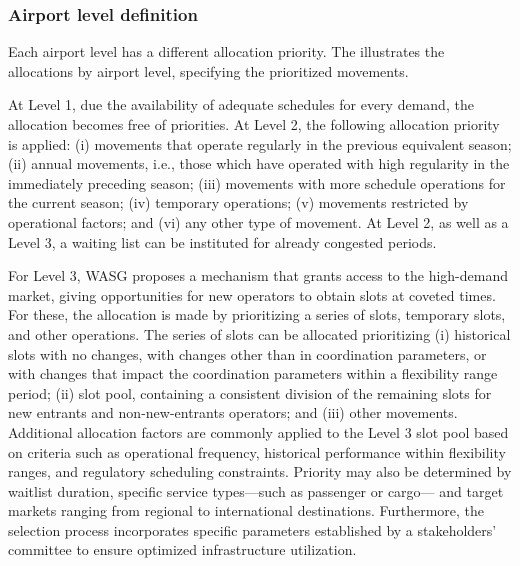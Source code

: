 \subsubsection{Airport level definition}



Each airport level has a different allocation priority.
%
The  illustrates the allocations by airport level,
specifying the prioritized movements.




%



At Level 1, due the availability of adequate schedules for every demand, the
allocation becomes free of priorities.
%
At Level 2, the following allocation priority is applied: (i) movements that
operate regularly in the previous equivalent season; (ii) annual movements,
i.e., those which have operated with high regularity in the immediately
preceding season; (iii) movements with more schedule operations for the current
season; (iv) temporary operations; (v) movements restricted by operational
factors; and (vi) any other type of movement.
%
At Level 2, as well as a Level 3, a waiting list can be instituted for already
congested periods.



For Level 3, \acrshort{WASG} proposes a mechanism that grants access to the
high-demand market, giving opportunities for new operators to obtain slots at
coveted times.
%
For these, the allocation is made by prioritizing a series of slots, temporary
slots, and other operations.
%
The series of slots can be allocated prioritizing (i) historical slots with no
changes, with changes other than in coordination parameters, or with changes
that impact the coordination parameters within a flexibility range period; (ii)
slot pool, containing a consistent division of the remaining slots for new
entrants and non-new-entrants operators; and (iii) other movements.
%
Additional allocation factors are commonly applied to the Level 3 slot pool
based on criteria such as operational frequency, historical performance within
flexibility ranges, and regulatory scheduling constraints.
%
Priority may also be determined by waitlist duration, specific service
types—such as passenger or cargo— and target markets ranging from regional to
international destinations.
%
Furthermore, the selection process incorporates specific parameters established
by a stakeholders' committee to ensure optimized infrastructure utilization.



